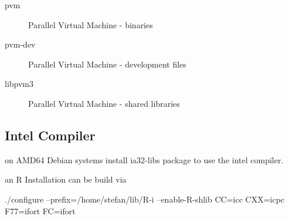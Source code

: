 \begin{description}
\item[pvm] Parallel Virtual Machine - binaries 
\item[pvm-dev] Parallel Virtual Machine - development files
\item[libpvm3] Parallel Virtual Machine - shared libraries
\end{description}


\subsection{Intel Compiler}

on AMD64 Debian systems install ia32-libs package to use the intel
compiler.

an R Installation can be build via

./configure --prefix=/home/stefan/lib/R-i --enable-R-shlib CC=icc
CXX=icpc F77=ifort FC=ifort

